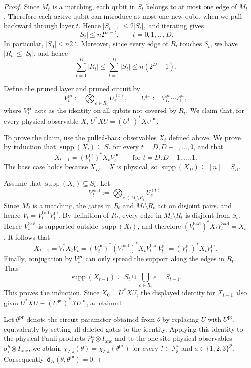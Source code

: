 \documentclass[10pt,a4paper]{amsart}
\newcommand{\mcI}{\mathcal{I}}
\begin{document}
\begin{proof}
Since \(M_t\) is a matching, each qubit in \(S_t\) belongs to at most one edge
of \(M_t\). Therefore each active qubit can introduce at most one new qubit
when we pull backward through layer \(t\). Hence $|S_{t-1}|\le 2|S_t|,$ and iterating gives
\[
    |S_t|\le n2^{D-t},
    \qquad t=0,1,\dots,D.
\]
In particular, \(|S_0|\le n2^D\). Moreover, since every edge of \(R_t\)
touches \(S_t\), we have \(|R_t|\le |S_t|\), and hence
\[
    \sum_{t=1}^D |R_t|
    \le
    \sum_{t=1}^D |S_t|
    \le
    n(2^D-1).
\]

Define the pruned layer and pruned circuit by
\[
    V_t^{\mathrm{pr}}
    :=
    \bigotimes_{e\in R_t}U_e^{(t)},
    \qquad 
    U^{\mathrm{pr}}
    :=
    V_D^{\mathrm{pr}}\cdots V_1^{\mathrm{pr}},
\]
where \(V_t^{\mathrm{pr}}\) acts as the identity on all qubits not covered by
\(R_t\). We claim that, for every physical observable \(X\), $U^*XU=(U^{\mathrm{pr}})^*XU^{\mathrm{pr}}$.

To prove the claim, use the pulled-back observables \(X_t\) defined above. We prove by induction that \(\operatorname{supp}(X_t)\subseteq S_t\) for every
\(t=D,D-1,\dots,0\), and that
\[
    X_{t-1}=(V_t^{\mathrm{pr}})^*X_tV_t^{\mathrm{pr}}
    \qquad\text{for }t=D,D-1,\dots,1.
\]
The base case holds because \(X_D=X\) is physical, so
\(\operatorname{supp}(X_D)\subseteq[n]=S_D\).

Assume that \(\operatorname{supp}(X_t)\subseteq S_t\). Let
\[
    V_t^{\mathrm{bad}}
    :=
    \bigotimes_{e\in M_t\setminus R_t}U_e^{(t)}.
\]
Since \(M_t\) is a matching, the gates in \(R_t\) and \(M_t\setminus R_t\)
act on disjoint pairs, and hence $V_t=V_t^{\mathrm{bad}}V_t^{\mathrm{pr}}$. By definition of \(R_t\), every edge in \(M_t\setminus R_t\) is disjoint from
\(S_t\). Hence \(V_t^{\mathrm{bad}}\) is supported outside
\(\operatorname{supp}(X_t)\), and therefore $(V_t^{\mathrm{bad}})^*X_tV_t^{\mathrm{bad}}=X_t$. It follows that
\[
    X_{t-1}
    =
    V_t^*X_tV_t
    =
    (V_t^{\mathrm{pr}})^*
    (V_t^{\mathrm{bad}})^*
    X_t
    V_t^{\mathrm{bad}}
    V_t^{\mathrm{pr}}
    =
    (V_t^{\mathrm{pr}})^*X_tV_t^{\mathrm{pr}} .
\]
Finally, conjugation by \(V_t^{\mathrm{pr}}\) can only spread the support along
the edges in \(R_t\). Thus
\[
    \operatorname{supp}(X_{t-1})
    \subseteq
    S_t\cup\bigcup_{e\in R_t}e
    =
    S_{t-1}.
\]
This proves the induction. Since \(X_0=U^*XU\), the displayed identity for
\(X_{t-1}\) also gives $U^*XU=(U^{\mathrm{pr}})^*XU^{\mathrm{pr}}$, as claimed.

Let \(\theta^{\mathrm{pr}}\) denote the circuit parameter obtained from
\(\theta\) by replacing \(U\) with \(U^{\mathrm{pr}}\), equivalently by setting
all deleted gates to the identity. Applying this identity to the physical
Pauli products \(P_I^a\otimes I_{\mathrm{anc}}\) and to the one-site physical
observables \(\sigma_i^b\otimes I_{\mathrm{anc}}\), we obtain $\chi_{I,a}(\theta)=\chi_{I,a}(\theta^{\mathrm{pr}})$ for every \(I\in\mcI_p^n\) and \(a\in\{1,2,3\}^p\). Consequently, $\mathsf d_R(\theta,\theta^{\mathrm{pr}})=0$.


\end{proof}
\end{document}
